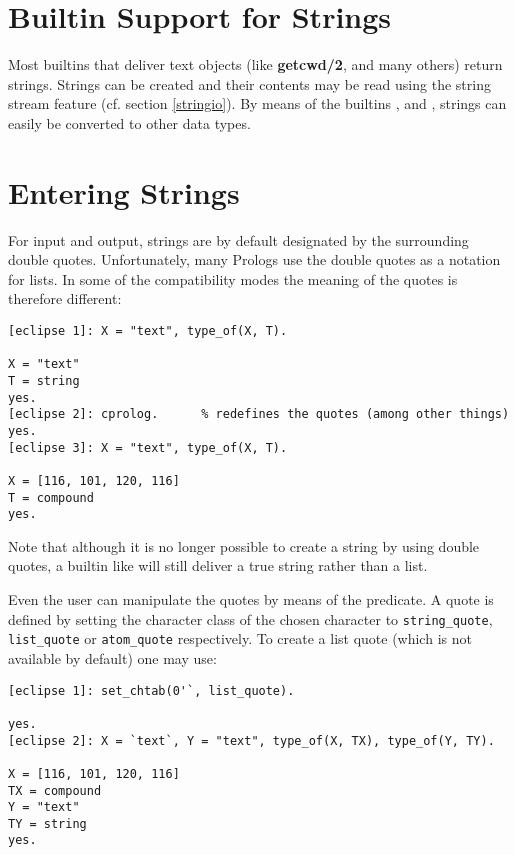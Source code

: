 \section{Builtin Support for Strings}
Most {\eclipse} builtins that deliver text objects (like {\bf getcwd/2},
 and many others) return strings.
Strings can be created and their contents may be read using the string
stream feature (cf. section \ref{stringio}).
By means of the builtins ,  and
, strings can easily be converted to other data types.

\section{Entering Strings}
For input and output, {\eclipse} strings are by default designated by the
surrounding double quotes.
Unfortunately, many Prologs use the double quotes as a notation for lists.
In some of the compatibility modes the meaning of the quotes is therefore
different:
\begin{verbatim}
[eclipse 1]: X = "text", type_of(X, T).

X = "text"
T = string
yes.
[eclipse 2]: cprolog.      % redefines the quotes (among other things)
yes.
[eclipse 3]: X = "text", type_of(X, T).

X = [116, 101, 120, 116]
T = compound
yes.
\end{verbatim}
Note that although it is no longer possible to create a string
by using double quotes, a builtin like  will still
deliver a true string rather than a list.

Even the  user can manipulate the quotes by means of the 
predicate.
A quote is defined by setting the character class of the chosen character
to {\tt string_quote}, {\tt list_quote} or {\tt atom_quote} respectively.
To create a list quote (which is not available by default)
one may use:
\begin{verbatim}
[eclipse 1]: set_chtab(0'`, list_quote).

yes.
[eclipse 2]: X = `text`, Y = "text", type_of(X, TX), type_of(Y, TY).

X = [116, 101, 120, 116]
TX = compound
Y = "text"
TY = string
yes.
\end{verbatim}

